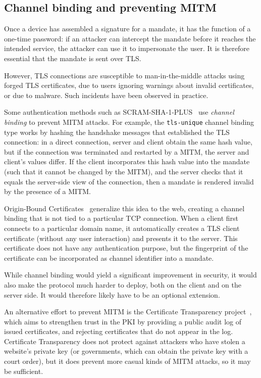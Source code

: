 \subsection{Channel binding and preventing MITM}\label{sec:channelbinding}

Once a device has assembled a signature for a mandate, it has the function of a one-time password:
if an attacker can intercept the mandate before it reaches the intended service, the attacker can
use it to impersonate the user. It is therefore essential that the mandate is sent over TLS.

However, TLS connections are susceptible to man-in-the-middle attacks using forged TLS certificates,
due to users ignoring warnings about invalid certificates, or due to malware. Such incidents have
been observed in practice.~\cite{Huang14, Adkins11}

Some authentication methods such as SCRAM-SHA-1-PLUS~\cite{SCRAM} use \emph{channel binding} to
prevent MITM attacks. For example, the \texttt{tls-unique} channel binding type works by hashing the
handshake messages that established the TLS connection: in a direct connection, server and client
obtain the same hash value, but if the connection was terminated and restarted by a MITM, the server
and client's values differ. If the client incorporates this hash value into the mandate (such that
it cannot be changed by the MITM), and the server checks that it equals the server-side view of the
connection, then a mandate is rendered invalid by the presence of a MITM.

Origin-Bound Certificates~\cite{Dietz12} generalize this idea to the web, creating a channel
binding that is not tied to a particular TCP connection. When a client first connects to a
particular domain name, it automatically creates a TLS client certificate (without any user
interaction) and presents it to the server. This certificate does not have any authentication
purpose, but the fingerprint of the certificate can be incorporated as channel identifier into a
mandate.

While channel binding would yield a significant improvement in security, it would also make the
protocol much harder to deploy, both on the client and on the server side. It would therefore likely
have to be an optional extension.

An alternative effort to prevent MITM is the Certificate Transparency project~\cite{CertTrans},
which aims to strengthen trust in the PKI by providing a public audit log of issued certificates,
and rejecting certificates that do not appear in the log. Certificate Transparency does not protect
against attackers who have stolen a website's private key (or governments, which can obtain the
private key with a court order), but it does prevent more casual kinds of MITM attacks, so it may be
sufficient.
